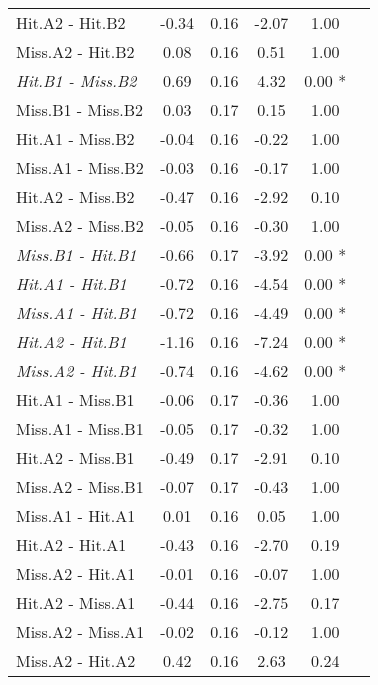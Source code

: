 \begin{landscape}
\begin{table}
\begin{multicols}{4}
\begin{tabular}{|l|*{5}{c|}}
Hit.A2 - Hit.B2 & -0.34 & 0.16 & -2.07 & 1.00 \\ 
Miss.A2 - Hit.B2 & 0.08 & 0.16 & 0.51 & 1.00 \\ 
\textit{Hit.B1 - Miss.B2} & 0.69 & 0.16 & 4.32 & 0.00 * \\ 
Miss.B1 - Miss.B2 & 0.03 & 0.17 & 0.15 & 1.00 \\ 
Hit.A1 - Miss.B2 & -0.04 & 0.16 & -0.22 & 1.00 \\ 
Miss.A1 - Miss.B2 & -0.03 & 0.16 & -0.17 & 1.00 \\ 
Hit.A2 - Miss.B2 & -0.47 & 0.16 & -2.92 & 0.10 \\ 
Miss.A2 - Miss.B2 & -0.05 & 0.16 & -0.30 & 1.00 \\ 
\textit{Miss.B1 - Hit.B1} & -0.66 & 0.17 & -3.92 & 0.00 * \\ 
\textit{Hit.A1 - Hit.B1} & -0.72 & 0.16 & -4.54 & 0.00 * \\ 
\textit{Miss.A1 - Hit.B1} & -0.72 & 0.16 & -4.49 & 0.00 * \\ 
\textit{Hit.A2 - Hit.B1} & -1.16 & 0.16 & -7.24 & 0.00 * \\ 
\textit{Miss.A2 - Hit.B1} & -0.74 & 0.16 & -4.62 & 0.00 * \\ 
Hit.A1 - Miss.B1 & -0.06 & 0.17 & -0.36 & 1.00 \\ 
Miss.A1 - Miss.B1 & -0.05 & 0.17 & -0.32 & 1.00 \\ 
Hit.A2 - Miss.B1 & -0.49 & 0.17 & -2.91 & 0.10 \\ 
Miss.A2 - Miss.B1 & -0.07 & 0.17 & -0.43 & 1.00 \\ 
Miss.A1 - Hit.A1 & 0.01 & 0.16 & 0.05 & 1.00 \\ 
Hit.A2 - Hit.A1 & -0.43 & 0.16 & -2.70 & 0.19 \\ 
Miss.A2 - Hit.A1 & -0.01 & 0.16 & -0.07 & 1.00 \\ 
Hit.A2 - Miss.A1 & -0.44 & 0.16 & -2.75 & 0.17 \\ 
Miss.A2 - Miss.A1 & -0.02 & 0.16 & -0.12 & 1.00 \\ 
Miss.A2 - Hit.A2 & 0.42 & 0.16 & 2.63 & 0.24 \\ 
\hline
\end{tabular}


\end{multicols}
\end{table}
\end{landscape}
